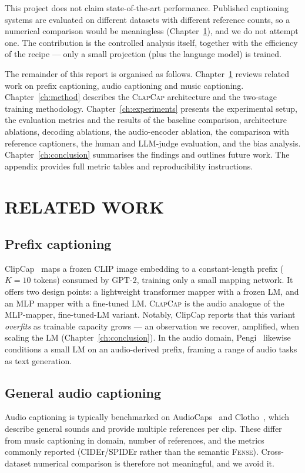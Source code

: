 \documentclass[9pt]{report}
\newcommand{\fense}{\textsc{Fense}}
\newcommand{\sys}{\textsc{ClapCap}}
\begin{document}
This project does not claim state-of-the-art performance. Published captioning systems are
evaluated on different datasets with different reference counts, so a numerical comparison
would be meaningless (Chapter~\ref{ch:related}), and we do not attempt one. The contribution
is the controlled analysis itself, together with the efficiency of the recipe --- only a small
projection (plus the language model) is trained.

The remainder of this report is organised as follows. Chapter~\ref{ch:related} reviews related
work on prefix captioning, audio captioning and music captioning.
Chapter~\ref{ch:method} describes the \sys{} architecture and the two-stage training
methodology. Chapter~\ref{ch:experiments} presents the experimental setup, the evaluation
metrics and the results of the baseline comparison, architecture ablations, decoding ablations,
the audio-encoder ablation, the comparison with reference captioners, the human and LLM-judge
evaluation, and the bias analysis. Chapter~\ref{ch:conclusion} summarises the findings and
outlines future work. The appendix provides full metric tables and reproducibility instructions.

\chapter{RELATED WORK}\label{ch:related}

\section{Prefix captioning}
ClipCap~\cite{mokady2021clipcap} maps a frozen CLIP image embedding to a constant-length prefix
($K{=}10$ tokens) consumed by GPT-2, training only a small mapping network. It offers two design
points: a lightweight transformer mapper with a frozen LM, and an MLP mapper with a fine-tuned
LM. \sys{} is the audio analogue of the MLP-mapper, fine-tuned-LM variant. Notably, ClipCap
reports that this variant \emph{overfits} as trainable capacity grows --- an observation we
recover, amplified, when scaling the LM (Chapter~\ref{ch:conclusion}). In the audio domain,
Pengi~\cite{deshmukh2023pengi} likewise conditions a small LM on an audio-derived prefix,
framing a range of audio tasks as text generation.

\section{General audio captioning}
Audio captioning is typically benchmarked on AudioCaps~\cite{kim2019audiocaps} and
Clotho~\cite{drossos2020clotho}, which describe general sounds and provide multiple references
per clip. These differ from music captioning in domain, number of references, and the metrics
commonly reported (CIDEr/SPIDEr rather than the semantic \fense{}). Cross-dataset numerical
comparison is therefore not meaningful, and we avoid it.
\end{document}

